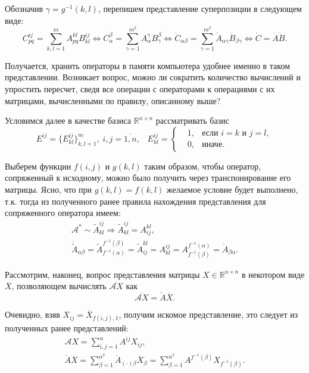 \documentclass[12pt]{article}
\theoremstyle{rusdef}
\newcommand{\R}{\ensuremath{\mathbb{R}}} %
\begin{document}
Обозначив $\gamma = g^{-1}(k,l)$, перепишем представление суперпозиции в следующем виде:
$$
C^{ij}_{pq} = \sum_{k,l=1}^{m} A^{kl}_{pq}B^{ij}_{kl} \Leftrightarrow C_{\alpha}^{\beta} = \sum_{\gamma = 1}^{m^2} A_{\alpha}^{\gamma} B_{\gamma}^{\beta} \Leftrightarrow \mathring{C}_{\alpha\beta} = \sum_{\gamma = 1}^{m^2} \mathring{A}_{\alpha\gamma} \mathring{B}_{\beta\gamma} \Leftrightarrow \mathring{C} = \mathring{A} \mathring{B}.
$$

Получается, хранить операторы в памяти компьютера удобнее именно в таком представлении. Возникает вопрос, можно ли сократить количество вычислений и упростить пересчет, сведя все операции с операторами к операциями с их матрицами, вычисленными по правилу, описанному выше?

Условимся далее в качестве базиса $\R^{n \times n}$ рассматривать базис
$$
E^{ij} = \{ E^{ij}_{kl} \}_{k,l = 1}^{m}, \; i,j=\overline{1,n}, \;\;\;
E^{ij}_{kl} = \left\{
\begin{aligned}
&1, & \text{если } i = k \text{ и } j = l,\\
&0, & \text{иначе}.
\end{aligned}
\right.
$$

Выберем функции $f(i,j)$ и $g(k,l)$ таким образом, чтобы оператор, сопряженный к исходному, можно было получить через транспонирование его матрицы. Ясно, что при $g(k,l) = f(k,l)$ желаемое условие будет выполнено, т.к. тогда из полученного ранее правила нахождения представления для сопряженного оператора имеем:
\begin{gather*}
\mathcal{A}^* \sim \tilde{A}^{ij}_{kl} \Rightarrow \tilde{A}_{kl}^{ij} = A_{ij}^{kl},\\
\mathring{\tilde{A}}_{\alpha\beta} = \tilde{A}_{f^{-1}(\alpha)}^{f^{-1}(\beta)} = \tilde{A}_{ij}^{kl} = A_{kl}^{ij} = A_{f^{-1}(\beta)}^{f^{-1}(\alpha)} = \mathring{A}_{\beta\alpha}.
\end{gather*}

Рассмотрим, наконец, вопрос представления матрицы $X \in \R^{n \times n}$ в некотором виде $\overline{X}$, позволяющем вычислять $\overline{\mathcal{A}X}$ как 
$$
\overline{\mathcal{A}X} = \mathring{A}\overline{X}.
$$

Очевидно, взяв $X_{ij} = \overline{X}_{f(i,j),1}$, получим искомое представление, это следует из полученных ранее представлений:
\begin{gather*}
\mathcal{A}X = \sum_{i,j=1}^{n} A^{ij} X_{ij}, \\
\mathring{A}\overline{X} = \sum_{\beta=1}^{n^2} \mathring{A}_{(\cdot)\beta} \overline{X}_{\beta} = \sum_{\beta=1}^{n^2} A^{f^{-1}(\beta)} X_{f^{-1}(\beta)}. 
\end{gather*}
\end{document}
